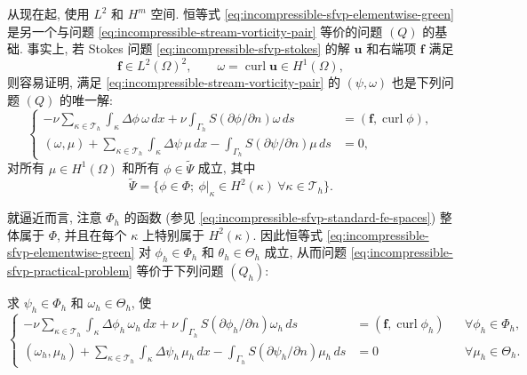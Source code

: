 从现在起, 使用 $L^2$ 和 $H^m$ 空间.
恒等式 \eqref{eq:incompressible-sfvp-elementwise-green}
是另一个与问题 \eqref{eq:incompressible-stream-vorticity-pair}
等价的问题 $(Q)$ 的基础.
事实上, 若 Stokes 问题 \eqref{eq:incompressible-sfvp-stokes}
的解 $\mathbf u$ 和右端项 $\mathbf f$ 满足
\[
\mathbf f\in L^2(\Omega)^2,
\qquad
\omega=\operatorname{curl}\mathbf u\in H^1(\Omega),
\]
则容易证明, 满足
\eqref{eq:incompressible-stream-vorticity-pair} 的 $(\psi,\omega)$
也是下列问题 $(Q)$ 的唯一解:
\[
\left\{
\begin{aligned}
-\nu\sum_{\kappa\in\mathcal T_h}
\int_\kappa\Delta\phi\,\omega\,dx
+\nu\int_{\Gamma_h}S(\partial\phi/\partial n)\omega\,ds
&=(\mathbf f,\operatorname{curl}\phi),\\
(\omega,\mu)
+\sum_{\kappa\in\mathcal T_h}\int_\kappa\Delta\psi\,\mu\,dx
-\int_{\Gamma_h}S(\partial\psi/\partial n)\mu\,ds
&=0,
\end{aligned}
\right.
\]
对所有 $\mu\in H^1(\Omega)$ 和所有 $\phi\in\widetilde\Psi$ 成立, 其中
\[
\widetilde\Psi
=\{\phi\in\Phi;\ \phi|_\kappa\in H^2(\kappa)
\ \forall\kappa\in\mathcal T_h\}.
\]

就逼近而言, 注意 $\Phi_h$ 的函数
(参见 \eqref{eq:incompressible-sfvp-standard-fe-spaces})
整体属于 $\Phi$, 并且在每个 $\kappa$ 上特别属于 $H^2(\kappa)$.
因此恒等式 \eqref{eq:incompressible-sfvp-elementwise-green}
对 $\phi_h\in\Phi_h$ 和 $\theta_h\in\Theta_h$ 成立,
从而问题 \eqref{eq:incompressible-sfvp-practical-problem}
等价于下列问题 $(Q_h)$:

求 $\psi_h\in\Phi_h$ 和 $\omega_h\in\Theta_h$, 使
\begin{equation}\label{eq:incompressible-sfvp-mesh-discrete-problem}
\left\{
\begin{aligned}
-\nu\sum_{\kappa\in\mathcal T_h}
\int_\kappa\Delta\phi_h\,\omega_h\,dx
+\nu\int_{\Gamma_h}S(\partial\phi_h/\partial n)\omega_h\,ds
&=(\mathbf f,\operatorname{curl}\phi_h)
&&\forall\phi_h\in\Phi_h,\\
(\omega_h,\mu_h)
+\sum_{\kappa\in\mathcal T_h}
\int_\kappa\Delta\psi_h\,\mu_h\,dx
-\int_{\Gamma_h}S(\partial\psi_h/\partial n)\mu_h\,ds
&=0
&&\forall\mu_h\in\Theta_h.
\end{aligned}
\right.
\end{equation}

